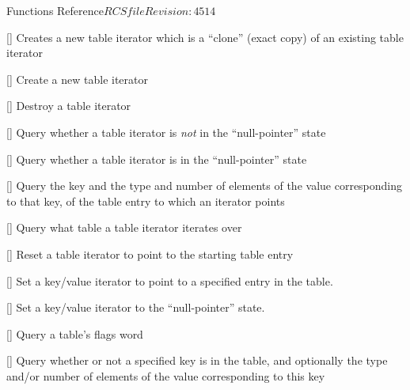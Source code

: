 \begin{cactuspart}{ Functions Reference}{$RCSfile$}{$Revision: 4514 $}
\begin{Lentry}
\item[\code{Util\_TableItClone}]
     [\pageref{Util-TableItClone}]
Creates a new table iterator which is a ``clone'' (exact copy) of an
existing table iterator

\item[\code{Util\_TableItCreate}]
     [\pageref{Util-TableItCreate}]
Create a new table iterator

\item[\code{Util\_TableItDestroy}]
     [\pageref{Util-TableItDestroy}]
Destroy a table iterator

\item[\code{Util\_TableItQueryIsNonNull}]
     [\pageref{Util-TableItQueryIsNonNull}]
Query whether a table iterator is {\em not\/} in the ``null-pointer'' state

\item[\code{Util\_TableItQueryIsNull}]
     [\pageref{Util-TableItQueryIsNull}]
Query whether a table iterator is in the ``null-pointer'' state

\item[\code{Util\_TableItQueryKeyValueInfo}]
     [\pageref{Util-TableItQueryKeyValueInfo}]
Query the key and the type and number of elements of the value
corresponding to that key, of the table entry to which an iterator points

\item[\code{Util\_TableItQueryTableHandle}]
     [\pageref{Util-TableItQueryTableHandle}]
Query what table a table iterator iterates over

\item[\code{Util\_TableItResetToStart}]
     [\pageref{Util-TableItResetToStart}]
Reset a table iterator to point to the starting table entry

\item[\code{Util\_TableItSetToKey}]
     [\pageref{Util-TableItSetToKey}]
Set a key/value iterator to point to a specified entry in the table.

\item[\code{Util\_TableItSetToNull}]
     [\pageref{Util-TableItSetToNull}]
Set a key/value iterator to the ``null-pointer'' state.

\item[\code{Util\_TableQueryFlags}]
     [\pageref{Util-TableQueryFlags}]
Query a table's flags word

\item[\code{Util\_TableQueryValueInfo}]
     [\pageref{Util-TableQueryValueInfo}]
Query whether or not a specified key is in the table, and optionally
the type and/or number of elements of the value corresponding to this key


\end{Lentry}
\end{cactuspart}
